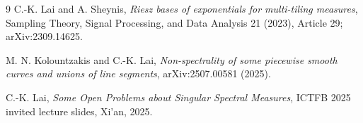 \documentclass[11pt]{article}
\begin{document}
\begin{thebibliography}{9}
C.-K. Lai and A. Sheynis,
\emph{Riesz bases of exponentials for multi-tiling measures},
Sampling Theory, Signal Processing, and Data Analysis 21 (2023), Article 29;
arXiv:2309.14625.

M. N. Kolountzakis and C.-K. Lai,
\emph{Non-spectrality of some piecewise smooth curves and unions of line
segments}, arXiv:2507.00581 (2025).

C.-K. Lai,
\emph{Some Open Problems about Singular Spectral Measures},
ICTFB 2025 invited lecture slides, Xi'an, 2025.
\end{thebibliography}
\end{document}
